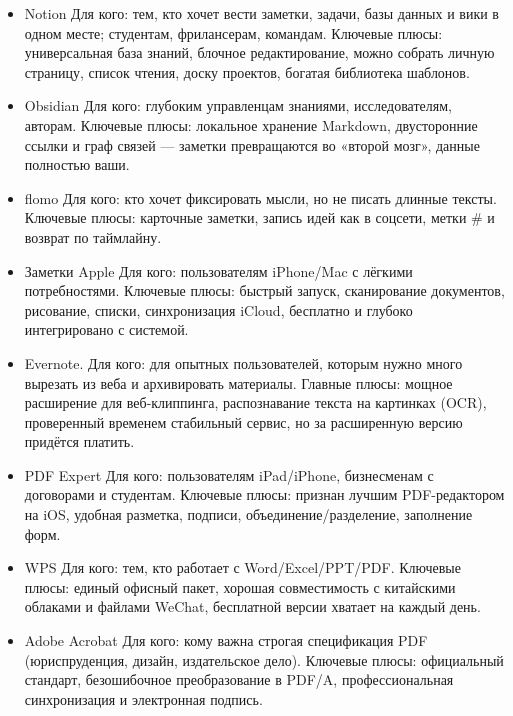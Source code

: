 \begin{itemize}
  \item Notion Для кого: тем, кто хочет вести заметки, задачи, базы данных и вики в одном месте; студентам, фрилансерам, командам. Ключевые плюсы: универсальная база знаний, блочное редактирование, можно собрать личную страницу, список чтения, доску проектов, богатая библиотека шаблонов.
  \item Obsidian Для кого: глубоким управленцам знаниями, исследователям, авторам. Ключевые плюсы: локальное хранение Markdown, двусторонние ссылки и граф связей — заметки превращаются во «второй мозг», данные полностью ваши.
  \item flomo Для кого: кто хочет фиксировать мысли, но не писать длинные тексты. Ключевые плюсы: карточные заметки, запись идей как в соцсети, метки \# и возврат по таймлайну.
  \item Заметки Apple Для кого: пользователям iPhone/Mac с лёгкими потребностями. Ключевые плюсы: быстрый запуск, сканирование документов, рисование, списки, синхронизация iCloud, бесплатно и глубоко интегрировано с системой.
  \item Evernote. Для кого: для опытных пользователей, которым нужно много вырезать из веба и архивировать материалы. Главные плюсы: мощное расширение для веб-клиппинга, распознавание текста на картинках (OCR), проверенный временем стабильный сервис, но за расширенную версию придётся платить.
\end{itemize}


\begin{itemize}
  \item PDF Expert Для кого: пользователям iPad/iPhone, бизнесменам с договорами и студентам. Ключевые плюсы: признан лучшим PDF-редактором на iOS, удобная разметка, подписи, объединение/разделение, заполнение форм.
  \item WPS Для кого: тем, кто работает с Word/Excel/PPT/PDF. Ключевые плюсы: единый офисный пакет, хорошая совместимость с китайскими облаками и файлами WeChat, бесплатной версии хватает на каждый день.
  \item Adobe Acrobat Для кого: кому важна строгая спецификация PDF (юриспруденция, дизайн, издательское дело). Ключевые плюсы: официальный стандарт, безошибочное преобразование в PDF/A, профессиональная синхронизация и электронная подпись.
\end{itemize}


